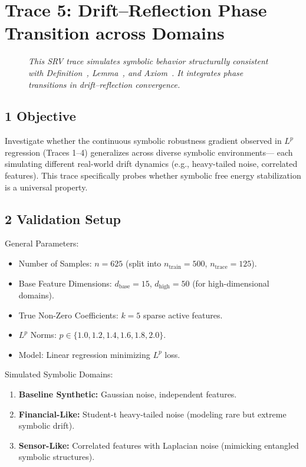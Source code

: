 \section*{Trace 5: Drift–Reflection Phase Transition across Domains}
\label{section:trace5_drift_reflection_transition}

\begin{figure}[htbp]
\centering
\caption[\textit{SRV trace (summary)}]{\textit{This SRV trace simulates symbolic behavior structurally consistent with Definition~, Lemma~, and Axiom~. It integrates phase transitions in drift–reflection convergence.}}
\label{figure:trace5_phase_transition_summary}
\end{figure}

\subsection*{1 Objective}
\label{subsection:trace5_objective}

Investigate whether the continuous symbolic robustness gradient  
observed in \( L^p \) regression (Traces 1–4)  
generalizes across diverse symbolic environments—  
each simulating different real-world drift dynamics  
(e.g., heavy-tailed noise, correlated features).  
This trace specifically probes whether symbolic free energy stabilization  
is a universal property.

\subsection*{2 Validation Setup}
\label{subsection:trace5_validation_setup}

General Parameters:
\begin{itemize}
    \item Number of Samples: $n = 625$ (split into $n_{\text{train}} = 500$, $n_{\text{trace}} = 125$).
    \item Base Feature Dimensions: $d_{\text{base}} = 15$, $d_{\text{high}} = 50$ (for high-dimensional domains).
    \item True Non-Zero Coefficients: $k = 5$ sparse active features.
    \item $L^p$ Norms: $p \in \{1.0, 1.2, 1.4, 1.6, 1.8, 2.0\}$.
    \item Model: Linear regression minimizing $L^p$ loss.
\end{itemize}

Simulated Symbolic Domains:
\begin{enumerate}
    \item \textbf{Baseline Synthetic:} Gaussian noise, independent features.
    \item \textbf{Financial-Like:} Student-t heavy-tailed noise (modeling rare but extreme symbolic drift).
    \item \textbf{Sensor-Like:} Correlated features with Laplacian noise (mimicking entangled symbolic structures).
\end{enumerate}

